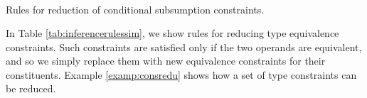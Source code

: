 \begin{table*}[!ht]
\begin{framed}
\begin{align*}
    \end{align*}\vspace{-1em}\end{framed}
    \smallskip
    \caption{Rules for reduction of conditional subsumption constraints.}
    \label{tab:inferencerulesss}
\end{table*}





In Table \ref{tab:inferencerulessim}, we show rules for reducing type equivalence constraints. Such constraints are satisfied only if the two operands are equivalent, and so we simply replace them with new equivalence constraints for their constituents. Example \ref{examp:consredu} shows how a set of type constraints can be reduced. \\ %

